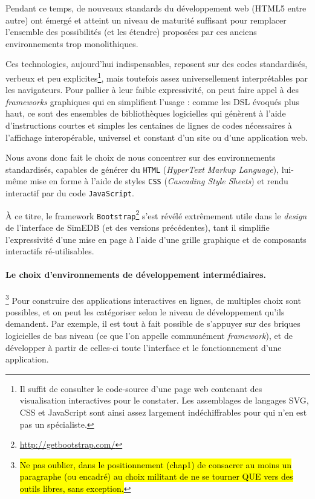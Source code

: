 Pendant ce temps, de nouveaux standards du développement web (\textsc{HTML5} entre autre) ont émergé et atteint un niveau de maturité suffisant pour remplacer l'ensemble des possibilités (et les étendre) proposées par ces anciens environnements trop monolithiques.

Ces technologies, aujourd'hui indispensables, reposent sur des codes standardisés, verbeux et peu explicites\footnote{
	Il suffit de consulter le code-source d'une page web contenant des visualisation interactives pour le constater.
	Les assemblages de langages SVG, CSS et JavaScript sont ainsi assez largement indéchiffrables pour qui n'en est pas un spécialiste.
}, mais toutefois assez universellement interprétables par les navigateurs.
Pour pallier à leur faible expressivité, on peut faire appel à des \textit{frameworks} graphiques qui en simplifient l'usage : comme les DSL évoqués plus haut, ce sont des ensembles de bibliothèques logicielles qui génèrent à l'aide d'instructions courtes et simples les centaines de lignes de codes nécessaires à l'affichage interopérable, universel et constant d'un site ou d'une application web.


Nous avons donc fait le choix de nous concentrer sur des environnements standardisés, capables de générer du \texttt{HTML} (\og \textit{HyperText Markup Language}\fg{}), lui-même mise en forme à l'aide de styles \texttt{CSS} (\og \textit{Cascading Style Sheets}\fg{}) et rendu interactif par du code \texttt{JavaScript}.

À ce titre, le framework \texttt{Bootstrap}\footnote{\href{http://getbootstrap.com/}{http://getbootstrap.com/}} s'est révélé extrêmement utile dans le \textit{design} de l'interface de SimEDB (et des versions précédentes), tant il simplifie l'expressivité d'une mise en page à l'aide d'une grille graphique et de composants interactifs ré-utilisables.

\paragraph{Le choix d'environnements de développement intermédiaires.}\footnote{
	\hl{Ne pas oublier, dans le positionnement (chap1) de consacrer au moins un paragraphe (ou encadré) au choix \og militant\fg{} de ne se tourner QUE vers des outils libres, sans exception.}
}
Pour construire des applications interactives en lignes, de multiples choix sont possibles, et on peut les catégoriser selon le niveau de développement qu'ils demandent.
Par exemple, il est tout à fait possible de s'appuyer sur des briques logicielles de bas niveau (ce que l'on appelle communément \textit{framework}), et de développer à partir de celles-ci toute l'interface et le fonctionnement d'une application.

